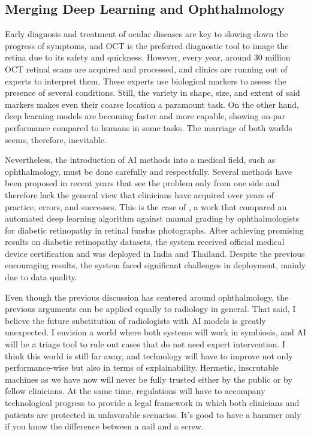 \subsection{Merging Deep Learning and Ophthalmology}
Early diagnosis and treatment of ocular diseases are key to slowing down the progress of symptoms, and OCT is the preferred diagnostic tool to image the retina due to its safety and quickness. However, every year, around 30 million OCT retinal scans are acquired and processed, and clinics are running out of experts to interpret them. These experts use biological markers to assess the presence of several conditions. Still, the variety in shape, size, and extent of said markers makes even their coarse location a paramount task. On the other hand, deep learning models are becoming faster and more capable, showing on-par performance compared to humans in some tasks. The marriage of both worlds seems, therefore, inevitable. 

Nevertheless, the introduction of AI methods into a medical field, such as ophthalmology, must be done carefully and respectfully. Several methods have been proposed in recent years that see the problem only from one side  and therefore lack the general view that clinicians have acquired over years of practice, errors, and successes. This is the case of , a work that compared an automated deep learning algorithm against manual grading by ophthalmologists for diabetic retinopathy in retinal fundus photographs. After achieving promising results on diabetic retinopathy datasets, the system received official medical device certification and was deployed in India and Thailand. Despite the previous encouraging results, the system faced significant challenges in deployment, mainly due to data quality.

Even though the previous discussion has centered around ophthalmology, the previous arguments can be applied equally to radiology in general. That said, I believe the future substitution of radiologists with AI models is greatly unexpected. I envision a world where both systems will work in symbiosis, and AI will be a triage tool to rule out cases that do not need expert intervention. I think this world is still far away, and technology will have to improve not only performance-wise but also in terms of explainability. Hermetic, inscrutable machines as we have now will never be fully trusted either by the public or by fellow clinicians. At the same time, regulations will have to accompany technological progress to provide a legal framework in which both clinicians and patients are protected in unfavorable scenarios. It's good to have a hammer only if you know the difference between a nail and a screw.
